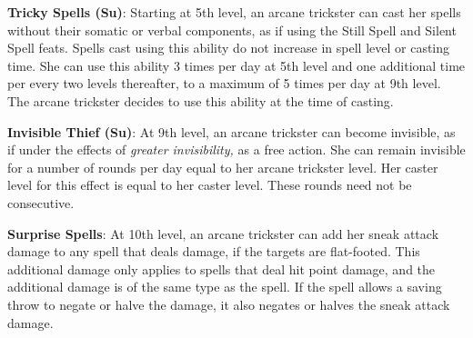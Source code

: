 \textbf{Tricky Spells (Su)}: Starting at 5th level, an arcane trickster can cast her spells without their somatic or verbal components, as if using the Still Spell and Silent Spell feats. Spells cast using this ability do not increase in spell level or casting time. She can use this ability 3 times per day at 5th level and one additional time per every two levels thereafter, to a maximum of 5 times per day at 9th level. The arcane trickster decides to use this ability at the time of casting.
				
\textbf{Invisible Thief (Su)}: At 9th level, an arcane trickster can become invisible, as if under the effects of \textit{greater invisibility,} as a free action. She can remain invisible for a number of rounds per day equal to her arcane trickster level. Her caster level for this effect is equal to her caster level. These rounds need not be consecutive.
				
\textbf{Surprise Spells}: At 10th level, an arcane trickster can add her sneak attack damage to any spell that deals damage, if the targets are flat-footed. This additional damage only applies to spells that deal hit point damage, and the additional damage is of the same type as the spell. If the spell allows a saving throw to negate or halve the damage, it also negates or halves the sneak attack damage.
        	
